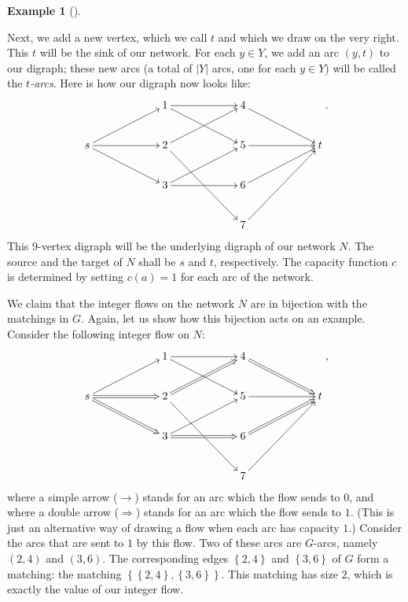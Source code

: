 \documentclass[numbers=enddot,12pt,final,onecolumn,notitlepage]{scrartcl}%
\theoremstyle{definition}
\newtheorem{exam}[theo]{Example}
\newenvironment{example}[1][]
{\begin{exam}[#1]\begin{leftbar}}
{\end{leftbar}\end{exam}}
\begin{document}
\begin{example}
Next, we add a new vertex, which we call $t$ and which we draw on the very
right. This $t$ will be the sink of our network. For each $y\in Y$, we add an
arc $\left(  y,t\right)  $ to our digraph; these new arcs (a total of
$\left\vert Y\right\vert $ arcs, one for each $y\in Y$) will be called the
$t$\textit{-arcs}. Here is how our digraph now looks like:%
\[%
\xymatrix@C=5pc{
& 1 \ar[r] \ar[rd] & 4 \ar[rd] \\
s \ar[ru] \ar[r] \ar[rd] & 2 \ar[ru] \ar[rdd] & 5 \ar[r] & t \\
& 3 \ar[ru] \ar[r] & 6 \ar[ru] \\
& & 7 \ar[ruu]
}%
.
\]
This $9$-vertex digraph will be the underlying digraph of our network $N$. The
source and the target of $N$ shall be $s$ and $t$, respectively. The capacity
function $c$ is determined by setting $c\left(  a\right)  =1$ for each arc of
the network.

We claim that the integer flows on the network $N$ are in bijection with the
matchings in $G$. Again, let us show how this bijection acts on an example.
Consider the following integer flow on $N$:%
\begin{equation}%
\xymatrix@C=5pc{
& 1 \ar[r] \ar[rd] & 4 \ar@{=>}[rd] \\
s \ar[ru] \ar@{=>}[r] \ar@{=>}[rd] & 2 \ar@{=>}[ru] \ar[rdd] & 5 \ar[r] & t \\
& 3 \ar[ru] \ar@{=>}[r] & 6 \ar@{=>}[ru] \\
& & 7 \ar[ruu]
}%
, \label{eq.exam.hall.bij1}%
\end{equation}
where a simple arrow ($\longrightarrow$) stands for an arc which the flow
sends to $0$, and where a double arrow ($\Longrightarrow$) stands for an arc
which the flow sends to $1$. (This is just an alternative way of drawing a
flow when each arc has capacity $1$.) Consider the arcs that are sent to $1$
by this flow. Two of these arcs are $G$-arcs, namely $\left(  2,4\right)  $
and $\left(  3,6\right)  $. The corresponding edges $\left\{  2,4\right\}  $
and $\left\{  3,6\right\}  $ of $G$ form a matching: the matching $\left\{
\left\{  2,4\right\}  ,\left\{  3,6\right\}  \right\}  $. This matching has
size $2$, which is exactly the value of our integer flow.
\end{example}
\end{document}
